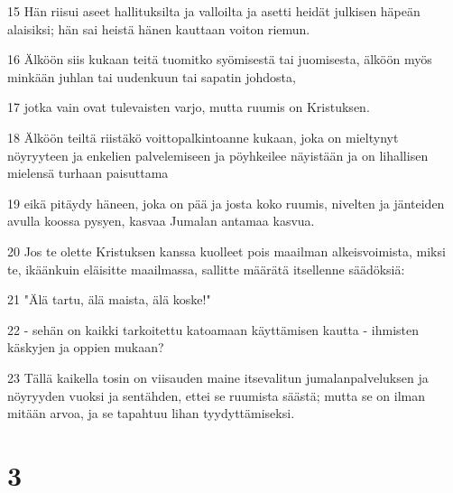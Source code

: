 \par 15 Hän riisui aseet hallituksilta ja valloilta ja asetti heidät julkisen häpeän alaisiksi; hän sai heistä hänen kauttaan voiton riemun.
\par 16 Älköön siis kukaan teitä tuomitko syömisestä tai juomisesta, älköön myös minkään juhlan tai uudenkuun tai sapatin johdosta,
\par 17 jotka vain ovat tulevaisten varjo, mutta ruumis on Kristuksen.
\par 18 Älköön teiltä riistäkö voittopalkintoanne kukaan, joka on mieltynyt nöyryyteen ja enkelien palvelemiseen ja pöyhkeilee näyistään ja on lihallisen mielensä turhaan paisuttama
\par 19 eikä pitäydy häneen, joka on pää ja josta koko ruumis, nivelten ja jänteiden avulla koossa pysyen, kasvaa Jumalan antamaa kasvua.
\par 20 Jos te olette Kristuksen kanssa kuolleet pois maailman alkeisvoimista, miksi te, ikäänkuin eläisitte maailmassa, sallitte määrätä itsellenne säädöksiä:
\par 21 "Älä tartu, älä maista, älä koske!"
\par 22 - sehän on kaikki tarkoitettu katoamaan käyttämisen kautta - ihmisten käskyjen ja oppien mukaan?
\par 23 Tällä kaikella tosin on viisauden maine itsevalitun jumalanpalveluksen ja nöyryyden vuoksi ja sentähden, ettei se ruumista säästä; mutta se on ilman mitään arvoa, ja se tapahtuu lihan tyydyttämiseksi.

\chapter{3}

